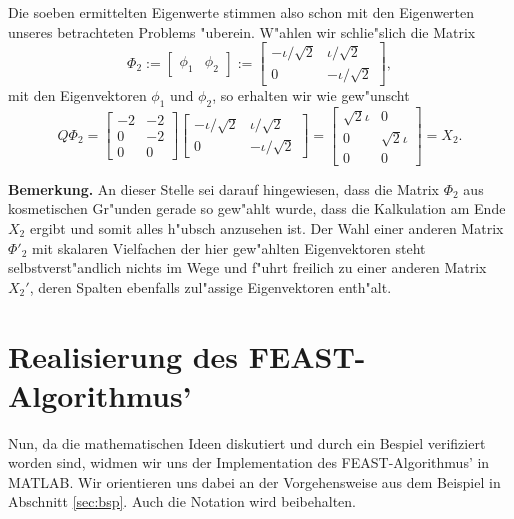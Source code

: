 Die soeben ermittelten Eigenwerte stimmen also schon mit den Eigenwerten
unseres betrachteten Problems "uberein. W"ahlen wir schlie"slich die Matrix
\[
\Phi_2 := \begin{bmatrix} \phi_1 & \phi_2 \end{bmatrix} :=
\begin{bmatrix} -\iota/\sqrt2  & \iota/\sqrt2 \\ 0 & -\iota/\sqrt2 \end{bmatrix},
\]
mit den Eigenvektoren $\phi_1$ und $\phi_2$, so erhalten wir wie gew"unscht
\[
Q\Phi_2 = \begin{bmatrix} -2 & -2 \\ 0 & -2\\0&0 \end{bmatrix}
\begin{bmatrix} -\iota/\sqrt2  & \iota/\sqrt2 \\ 0 & -\iota/\sqrt2 \end{bmatrix} =
\begin{bmatrix} \sqrt2 \iota & 0 \\ 0 & \sqrt2 \iota \\ 0 &0\end{bmatrix} = X_2.
\]

\textbf{Bemerkung.} An dieser Stelle sei darauf hingewiesen,
dass die Matrix $\Phi_2$ aus kosmetischen Gr"unden gerade so
gew"ahlt wurde, dass die Kalkulation am Ende $X_2$ ergibt und somit alles
h"ubsch anzusehen ist.
Der Wahl einer anderen Matrix $\Phi'_2$ mit skalaren Vielfachen der hier
gew"ahlten Eigenvektoren steht selbstverst"andlich nichts im Wege und f"uhrt freilich zu einer anderen
Matrix $X_2'$, deren Spalten ebenfalls zul"assige Eigenvektoren enth"alt.\\



\section{Realisierung des FEAST-Algorithmus'}

Nun, da die mathematischen Ideen diskutiert und durch ein Bespiel verifiziert
worden sind, widmen wir uns der Implementation des FEAST-Algorithmus' in MATLAB.
Wir orientieren uns dabei an der Vorgehensweise aus dem Beispiel in Abschnitt
\ref{sec:bsp}. Auch die Notation wird beibehalten.

